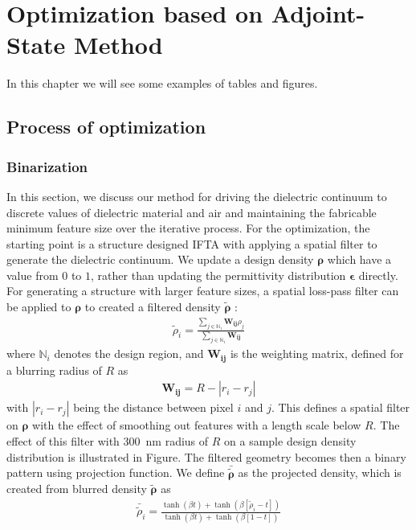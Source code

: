 \cleardoublepage
\chapter{Optimization based on Adjoint-State Method}
In this chapter we will see some examples of tables and figures.
\section{Process of optimization}
\subsection{Binarization}
In this section, we discuss our method for driving the dielectric continuum to discrete values of dielectric material and air and maintaining the fabricable minimum feature size over the iterative process.
For the optimization, the starting point is a structure designed IFTA with applying a spatial filter to generate the dielectric continuum.
We update a design density $\bm{\rho}$ which have a value from $0$ to $1$, rather than updating the permittivity distribution $\bm{\epsilon}$ directly.
For generating a structure with larger feature sizes, a spatial loss-pass filter can be applied to $\bm{\rho}$ to created a filtered density $\bm{\tilde{\rho}}$ :
\begin{align}\label{eq:filter}
\tilde{\rho}_i=\frac{\sum_{j\in\mathbb{N}_i} \bm{W_{ij}} \rho_{j}}{\sum_{j\in\mathbb{N}_i} \bm{W_{ij}}}
\end{align}
where $\mathbb{N}_i$ denotes the design region, and $\bm{W_{ij}}$ is the weighting matrix, defined for a blurring radius of $R$ as
\begin{align}
\bm{W_{ij}} = R - \left | r_i - r_j \right | 
\end{align}
with $\left | r_i - r_j \right |$ being the distance between pixel $i$ and $j$.
This defines a spatial filter on $\bm{\rho}$ with the effect of smoothing out features with a length scale below $R$. 
The effect of this filter with \SI{300}{\nano\metre} radius of $R$ on a sample design density distribution is illustrated in Figure.
The filtered geometry becomes then a binary pattern using projection function.
We define $\bm{\bar{\tilde{\rho}}}$ as the projected density, which is created from blurred density $\bm{\tilde{\rho}}$ as
\begin{align}\label{eq:projection}
\bar{\tilde{\rho}}_i=\frac{\tanh\left ( \beta t\right )+\tanh \left (\beta \left [\tilde{\rho}_i-t \right ]\right )}{\tanh\left ( \beta t\right )+\tanh \left (\beta \left [1-t \right ]\right )}
\end{align}
